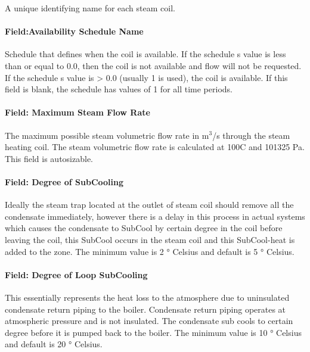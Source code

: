 A unique identifying name for each steam coil.

\paragraph{Field:Availability Schedule Name}\label{fieldavailability-schedule-name-2-000}

Schedule that defines when the coil is available. If the schedule s value is less than or equal to 0.0, then the coil is not available and flow will not be requested. If the schedule s value is \textgreater{} 0.0 (usually 1 is used), the coil is available. If this field is blank, the schedule has values of 1 for all time periods.

\paragraph{Field: Maximum Steam Flow Rate}\label{field-maximum-steam-flow-rate}

The maximum possible steam volumetric flow rate in m\(^{3}\)/s through the steam heating coil. The steam volumetric flow rate is calculated at 100C and 101325 Pa. This field is autosizable.

\paragraph{Field: Degree of SubCooling}\label{field-degree-of-subcooling}

Ideally the steam trap located at the outlet of steam coil should remove all the condensate immediately, however there is a delay in this process in actual systems which causes the condensate to SubCool by certain degree in the coil before leaving the coil, this SubCool occurs in the steam coil and this SubCool-heat is added to the zone. The minimum value is 2 ° Celsius and default is 5 ° Celsius.

\paragraph{Field: Degree of Loop SubCooling}\label{field-degree-of-loop-subcooling}

This essentially represents the heat loss to the atmosphere due to uninsulated condensate return piping to the boiler. Condensate return piping operates at atmospheric pressure and is not insulated. The condensate sub cools to certain degree before it is pumped back to the boiler. The minimum value is 10 ° Celsius and default is 20 ° Celsius.

